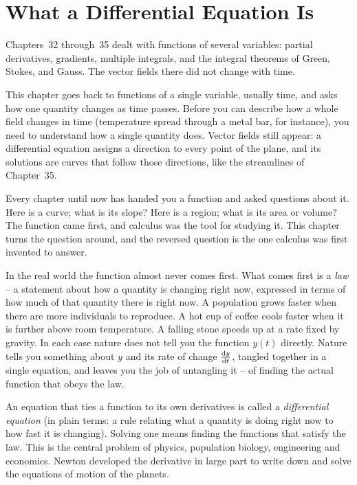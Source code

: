 \chapter{What a Differential Equation Is}

Chapters~32 through~35 dealt with functions of several variables: partial derivatives, gradients, multiple integrals, and the integral theorems of Green, Stokes, and Gauss. The vector fields there did not change with time.

This chapter goes back to functions of a single variable, usually time, and asks how one quantity changes as time passes. Before you can describe how a whole field changes in time (temperature spread through a metal bar, for instance), you need to understand how a single quantity does. Vector fields still appear: a differential equation assigns a direction to every point of the plane, and its solutions are curves that follow those directions, like the streamlines of Chapter~35.

Every chapter until now has handed you a function and asked questions about it. Here is a curve; what is its slope? Here is a region; what is its area or volume? The function came first, and calculus was the tool for studying it. This chapter turns the question around, and the reversed question is the one calculus was first invented to answer.

In the real world the function almost never comes first. What comes first is a \emph{law} -- a statement about how a quantity is changing right now, expressed in terms of how much of that quantity there is right now. A population grows faster when there are more individuals to reproduce. A hot cup of coffee cools faster when it is further above room temperature. A falling stone speeds up at a rate fixed by gravity. In each case nature does not tell you the function $y(t)$ directly. Nature tells you something about $y$ and its rate of change $\frac{\mathrm{d} y}{\mathrm{d} t}$, tangled together in a single equation, and leaves you the job of untangling it -- of finding the actual function that obeys the law.

An equation that ties a function to its own derivatives is called a \emph{differential equation} (in plain terms: a rule relating what a quantity is doing right now to how fast it is changing). Solving one means finding the functions that satisfy the law. This is the central problem of physics, population biology, engineering and economics. Newton developed the derivative in large part to write down and solve the equations of motion of the planets.

